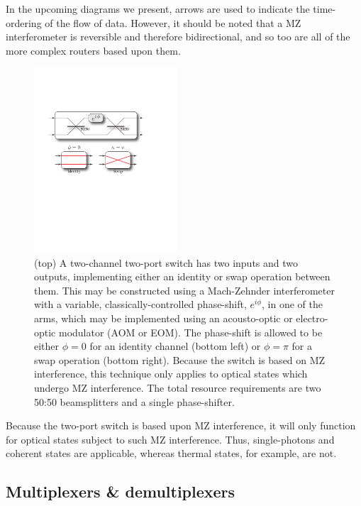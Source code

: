 In the upcoming diagrams we present, arrows are used to indicate the time-ordering of the flow of data. However, it should be noted that a MZ interferometer is reversible and therefore bidirectional, and so too are all of the more complex routers based upon them.

\begin{figure}[!htbp]
\includegraphics[clip=true, width=0.475\textwidth]{two_channel_two_port_switch}
\captionspacefig \caption{(top) A two-channel two-port switch has two inputs and two outputs, implementing either an identity or swap operation between them. This may be constructed using a Mach-Zehnder interferometer with a variable, classically-controlled phase-shift, $e^{i\phi}$, in one of the arms, which may be implemented using an acousto-optic or electro-optic modulator (AOM or EOM). The phase-shift is allowed to be either \mbox{$\phi=0$} for an identity channel (bottom left) or \mbox{$\phi=\pi$} for a swap operation (bottom right). Because the switch is based on MZ interference, this technique only applies to optical states which undergo MZ interference. The total resource requirements are two 50:50 beamsplitters and a single phase-shifter.} \label{fig:two_channel_two_port_switch} 
\end{figure}

Because the two-port switch is based upon MZ interference, it will only function for optical states subject to such MZ interference. Thus, single-photons and coherent states are applicable, whereas thermal states, for example, are not.

%
%

\subsection{Multiplexers \& demultiplexers} 

